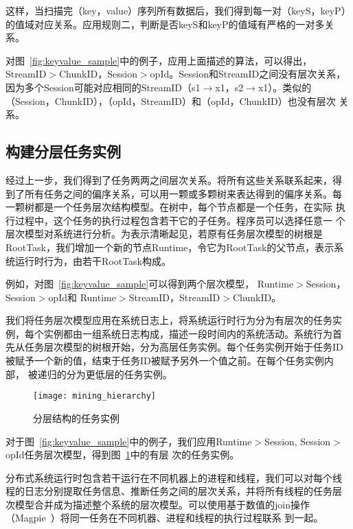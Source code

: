 这样，当扫描完（key，value）序列所有数据后，我们得到每一对（keyS，keyP）
的值域对应关系。应用规则二，判断是否keyS和keyP的值域有严格的一对多关系。

对图~\ref{fig:keyvalue_sample}中的例子，应用上面描述的算法，可以得出，
StreamID$>$ChunkID，Session$>$opId。Session和StreamID之间没有层次关系，
因为多个Session可能对应相同的StreamID（s1$\to$x1，s2$\to$x1）。类似的
（Session，ChunkID），（opId，StreamID）和（opId，ChunkID）也没有层次
关系。

\subsection{构建分层任务实例}

经过上一步，我们得到了任务两两之间层次关系。将所有这些关系联系起来，得
到了所有任务之间的偏序关系，可以用一颗或多颗树来表达得到的偏序关系。每
一颗树都是一个任务层次结构模型。在树中，每个节点都是一个任务，在实际
执行过程中，这个任务的执行过程包含若干它的子任务。程序员可以选择任意一
个层次模型对系统进行分析。为表示清晰起见，若原有任务层次模型的树根是
RootTask，我们增加一个新的节点Runtime，令它为RootTask的父节点，表示系
统运行时行为，由若干RootTask构成。

例如，对图~\ref{fig:keyvalue_sample}可以得到两个层次模型，
Runtime$>$Session，Session$>$opId和
Runtime$>$StreamID，StreamID$>$ChunkID。

我们将任务层次模型应用在系统日志上，将系统运行时行为分为有层次的任务实
例，每个实例都由一组系统日志构成，描述一段时间内的系统活动。系统行为首
先从任务层次模型的树根开始，分为高层任务实例。每个任务实例开始于任务ID
被赋予一个新的值，结束于任务ID被赋予另外一个值之前。在每个任务实例内部，
被递归的分为更低层的任务实例。

\begin{figure}
  \centering
  \begin{minipage}{0.8\linewidth}
    \centering
    \texttt{[image: mining\_hierarchy]}
    \caption{分层结构的任务实例}
    \label{fig:taskhierarchy_sample}
  \end{minipage}
\end{figure}


对于图~\ref{fig:keyvalue_sample}中的例子，我们应用Runtime$>$Session,
Session$>$opId任务层次模型，得到图~\ref{fig:taskhierarchy_sample}中的有层
次的任务实例。

分布式系统运行时包含若干运行在不同机器上的进程和线程，我们可以对每个线
程的日志分别提取任务信息、推断任务之间的层次关系，并将所有线程的任务层
次模型合并成为描述整个系统的层次模型。可以使用基于数值的join操作
（Magpie~\cite{magpie}）将同一任务在不同机器、进程和线程的执行过程联系
到一起。

